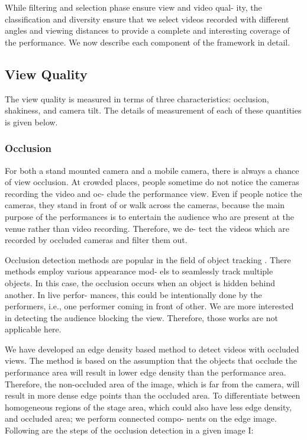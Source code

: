 \documentclass[conference]{IEEEtran}
\begin{document}
While filtering and selection phase ensure view and video qual-
ity, the classification and diversity ensure that we select videos
recorded with different angles and viewing distances to provide a
complete and interesting coverage of the performance. We now
describe each component of the framework in detail.

\subsection{View Quality}
The view quality is measured in terms of three characteristics:
occlusion, shakiness, and camera tilt. The details of measurement
of each of these quantities is given below.

\subsubsection{Occlusion}
For both a stand mounted camera and a mobile camera, there
is always a chance of view occlusion. At crowded places, people
sometime do not notice the cameras recording the video and oc-
clude the performance view. Even if people notice the cameras,
they stand in front of or walk across the cameras, because the main
purpose of the performances is to entertain the audience who are
present at the venue rather than video recording. Therefore, we de-
tect the videos which are recorded by occluded cameras and filter
them out.

Occlusion detection methods are popular in the field of object
tracking \cite{13,19}. There methods employ various appearance mod-
els to seamlessly track multiple objects. In this case, the occlusion
occurs when an object is hidden behind another. In live perfor-
mances, this could be intentionally done by the performers, i.e.,
one performer coming in front of other. We are more interested in
detecting the audience blocking the view. Therefore, those works
are not applicable here.

We have developed an edge density based method to detect videos
with occluded views. The method is based on the assumption that
the objects that occlude the performance area will result in lower
edge density than the performance area. Therefore, the non-occluded
area of the image, which is far from the camera, will result in more
dense edge points than the occluded area. To differentiate between
homogeneous regions of the stage area, which could also have less edge density, and occluded area; we perform connected compo-
nents on the edge image. Following are the steps of the occlusion
detection in a given image I:
\end{document}
